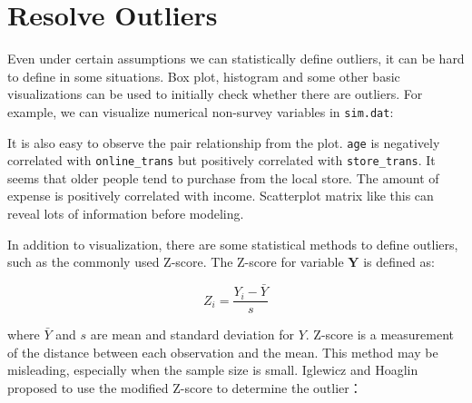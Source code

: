 \documentclass[12pt,]{krantz}
\makeatletter
\newenvironment{Shaded}{\begin{snugshade}}{\end{snugshade}}
\newcommand{\KeywordTok}[1]{\textcolor[rgb]{0.27,0.27,0.27}{\textbf{#1}}}
\newcommand{\DataTypeTok}[1]{\textcolor[rgb]{0.27,0.27,0.27}{#1}}
\newcommand{\DecValTok}[1]{\textcolor[rgb]{0.06,0.06,0.06}{#1}}
\newcommand{\StringTok}[1]{\textcolor[rgb]{0.5,0.5,0.5}{#1}}
\newcommand{\CommentTok}[1]{\textcolor[rgb]{0.37,0.37,0.37}{\textit{#1}}}
\newcommand{\OtherTok}[1]{\textcolor[rgb]{0.37,0.37,0.37}{#1}}
\newcommand{\NormalTok}[1]{#1}
\newenvironment{kframe}{%
\medskip{}
\setlength{\fboxsep}{.8em}
 \def\at@end@of@kframe{}%
 \ifinner\ifhmode%
  \def\at@end@of@kframe{\end{minipage}}%
  \begin{minipage}{\columnwidth}%
 \fi\fi%
 \def\FrameCommand##1{\hskip\@totalleftmargin \hskip-\fboxsep
 \colorbox{shadecolor}{##1}\hskip-\fboxsep
     \hskip-\linewidth \hskip-\@totalleftmargin \hskip\columnwidth}%
 \MakeFramed {\advance\hsize-\width
   \@totalleftmargin\z@ \linewidth\hsize
   \@setminipage}}%
 {\par\unskip\endMakeFramed%
 \at@end@of@kframe}
\renewenvironment{Shaded}{\begin{kframe}}{\end{kframe}}
\theoremstyle{definition}
\theoremstyle{definition}
\theoremstyle{definition}
\theoremstyle{remark}
\makeatother
\begin{document}
\section{Resolve Outliers}\label{resolve-outliers}

Even under certain assumptions we can statistically define outliers, it
can be hard to define in some situations. Box plot, histogram and some
other basic visualizations can be used to initially check whether there
are outliers. For example, we can visualize numerical non-survey
variables in \texttt{sim.dat}:

\begin{Shaded}
\end{Shaded}

It is also easy to observe the pair relationship from the plot.
\texttt{age} is negatively correlated with \texttt{online\_trans} but
positively correlated with \texttt{store\_trans}. It seems that older
people tend to purchase from the local store. The amount of expense is
positively correlated with income. Scatterplot matrix like this can
reveal lots of information before modeling.

In addition to visualization, there are some statistical methods to
define outliers, such as the commonly used Z-score. The Z-score for
variable \(\mathbf{Y}\) is defined as:

\[Z_{i}=\frac{Y_{i}-\bar{Y}}{s}\]

where \(\bar{Y}\) and \(s\) are mean and standard deviation for \(Y\).
Z-score is a measurement of the distance between each observation and
the mean. This method may be misleading, especially when the sample size
is small. Iglewicz and Hoaglin proposed to use the modified Z-score to
determine the outlier\citep{mad1}：
\end{document}
